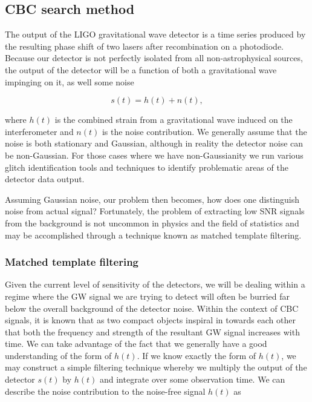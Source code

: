 %
%



\subsection{\ac{CBC} search method}

The output of the \ac{LIGO} gravitational wave detector is a time series produced by the resulting phase shift of two lasers after recombination on a photodiode. Because our detector is not perfectly isolated from all non-astrophysical sources, the output of the detector will be a function of both a gravitational wave impinging on it, as well some noise

\begin{equation}
    s(t) = h(t) + n(t),
\end{equation}{}

where $h(t)$ is the combined strain from a gravitational wave induced on the interferometer and $n(t)$ is the noise contribution. We generally assume that the noise is both stationary and Gaussian, although in reality the detector noise can be non-Gaussian. For those cases where we have non-Gaussianity we run various glitch identification tools and techniques to identify problematic areas of the detector data output. 

Assuming Gaussian noise, our problem then becomes, how does one distinguish noise from actual signal? Fortunately, the problem of extracting low \ac{SNR} signals from the background is not uncommon in physics and the field of statistics and may be accomplished through a technique known as matched template filtering.

\subsubsection{Matched template filtering}

Given the current level of sensitivity of the detectors, we will be dealing within a regime where the \ac{GW} signal we are trying to detect will often be burried far below the overall background of the detector noise. Within the context of \ac{CBC} signals, it is known that as two compact objects inspiral in towards each other that both the frequency and strength of the resultant \ac{GW} signal increases with time. We can take advantage of the fact that we generally have a good understanding of the form of $h(t)$. If we know exactly the form of $h(t)$, we may construct a simple filtering technique whereby we multiply the output of the detector $s(t)$ by $h(t)$ and integrate over some observation time. We can describe the noise contribution to the noise-free signal $h(t)$ as 

